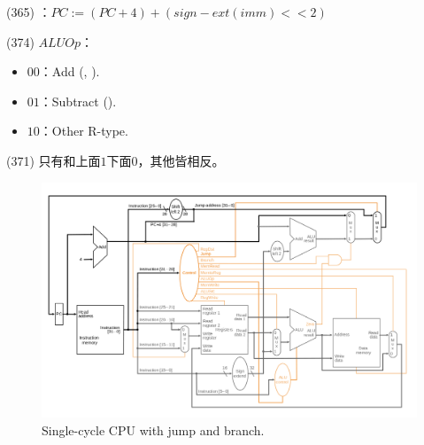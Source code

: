 \item \begin{theorem}{(365)} ：$PC := (PC + 4) + (sign-ext(imm) << 2)$
\end{theorem}

\item \begin{theorem}{(374)} $ALUOp$：\begin{itemize}
        \item $00$：Add (, ).
        \item $01$：Subtract ().
        \item $10$：Other R-type.
    \end{itemize}
\end{theorem}

\item \begin{theorem}{(371)} 只有和上面$1$下面$0$，其他皆相反。
    \begin{figure}[H]
        \centering
        \includegraphics[scale=0.3]{img/single-cycle-cpu.png}
        \caption{Single-cycle CPU with jump and branch.}
        \label{img:single-cycle-cpu}
    \end{figure}
\end{theorem}
